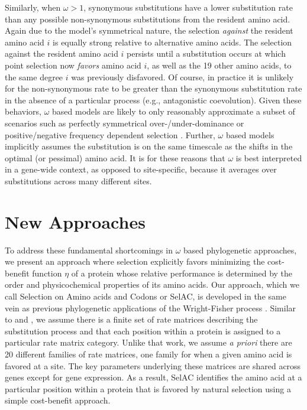 \documentclass[onecolumn,letterpaper,fleqn,nogrid]{myMBE}%
\newcommand{\PC}{physicochemical\xspace}
\newcommand{\selac}{SelAC\xspace}
\begin{document}
Similarly, when $\omega > 1$, synonymous substitutions have a lower substitution rate than any possible non-synonymous substitutions from the resident amino acid.
Again due to the model's symmetrical nature, the selection \emph{against} the resident amino acid $i$ is equally strong relative to alternative amino acids.
The selection against the resident amino acid $i$ persists until a substitution occurs at which point selection now \emph{favors} amino acid $i$, as well as the 19 other amino acids, to the same degree $i$ was previously disfavored.
Of course, in practice it is unlikely for the non-synonymous rate to be greater than the synonymous substitution rate in the absence of a particular process (e.g., antagonistic coevolution).
Given these behaviors, $\omega$ based models are likely to only reasonably approximate a subset of scenarios such as perfectly symmetrical over-/under-dominance or positive/negative frequency dependent selection \citep{HughesAndNei1988,Nowak2006}.
Further, $\omega$ based models implicitly assumes the substitution is on the same timescale as the shifts in the optimal (or pessimal) amino acid.
It is for these reasons that $\omega$ is best interpreted in a gene-wide context, as opposed to site-specific, because it averages over substitutions across many different sites.

\section{New Approaches} %
To address these fundamental shortcomings in $\omega$ based phylogenetic approaches, we present an approach where selection explicitly favors minimizing the cost-benefit function $\eta$ of a protein whose relative performance is determined by the order and \PC properties of its amino acids.
Our approach, which we call Selection on Amino acids and Codons or \selac, is developed in the same vein as previous phylogenetic applications of the Wright-Fisher process \citep[e.g.~][]{MuseAndGaut1994,HalpernAndBruno1998,YangAndNielsen2008,RodrigueEtAl2005,KoshiAndGoldstein1997,KoshiEtAl1999,DimmicEtAl2000,ThorneEtAl2012,LartillotAndPhilippe2004,RodrigueAndLartillot2014}.
Similar to  \citet{LartillotAndPhilippe2004} and \citet{RodrigueAndLartillot2014}, we assume there is a finite set of rate matrices describing the substitution process and that each position within a protein is assigned to a particular rate matrix category.
Unlike that work, we assume \emph{a priori} there are 20 different families of rate matrices, one family for when a given amino acid is favored at a site.
The key parameters underlying these matrices are shared across genes except for gene expression.
As a result, \selac identifies the amino acid at a particular position within a protein that is favored by natural selection using a simple cost-benefit approach.
\end{document}
